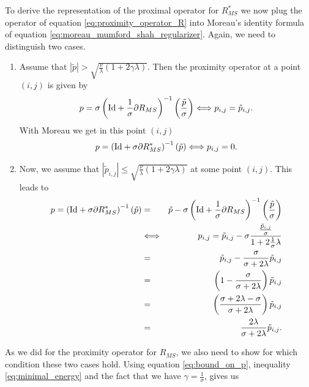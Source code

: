 \documentclass{scrreprt}
\begin{document}
            To derive the representation of the proximal operator for $R_{MS}^{\ast}$ we now plug the operator of equation \ref{eq:proximity_operator_R} into Moreau's identity formula of equation \ref{eq:moreau_mumford_shah_regularizer}. Again, we need to distinguish two cases.
            \begin{enumerate}
                \item Assume that $|\tilde{p}| > \sqrt{\frac{\nu}{\lambda}(1 + 2\gamma\lambda)}$. Then the proximity operator at a point $(i, j)$ is given by
                    $$
                        p = \sigma\left( \textnormal{Id} + \frac{1}{\sigma} \partial R_{MS} \right)^{-1} \left(\frac{\tilde{p}}{\sigma} \right) \Longleftrightarrow p_{i,j} = \tilde{p}_{i,j}.
                    $$
                With Moreau we get in this point $(i, j)$
                    $$
                        p = \left( \textnormal{Id} + \sigma \partial R_{MS}^{\ast} \right)^{-1}(\tilde{p}) \Longleftrightarrow p_{i,j} = 0.
                    $$
                \item Now, we assume that $|\tilde{p}_{i,j}| \le \sqrt{\frac{\nu}{\lambda}(1 + 2\gamma\lambda)}$ at some point $(i,j)$. This leads to
                    \begin{eqnarray}
                        p = \left( \textnormal{Id} + \sigma \partial R_{MS}^{\ast} \right)^{-1}(\tilde{p}) &=& \tilde{p} - \sigma \left( \textnormal{Id} + \frac{1}{\sigma} \partial R_{MS} \right)^{-1} \left(\frac{\tilde{p}}{\sigma} \right) \notag \\
                        &\Longleftrightarrow& p_{i,j} = \tilde{p}_{i,j} - \sigma \frac{\frac{\tilde{p}_{i,j}}{\sigma}}{1 + 2\frac{1}{\sigma}\lambda} \notag \\
                        &=& \tilde{p}_{i,j} - \frac{\sigma}{\sigma + 2\lambda}\tilde{p}_{i,j} \notag \\
                        &=& \left(1 - \frac{\sigma}{\sigma + 2\lambda}\right) \tilde{p}_{i,j} \notag \\
                        &=& \left(\frac{\sigma + 2\lambda - \sigma}{\sigma + 2\lambda}\right) \tilde{p}_{i,j} \notag \\
                        &=& \frac{2\lambda}{\sigma + 2\lambda} \tilde{p}_{i,j}. \notag
                    \end{eqnarray}
            \end{enumerate}
            As we did for the proximity operator for $R_{MS}$, we also need to show for which condition these two cases hold. Using equation \ref{eq:bound_on_p}, inequality \ref{eq:minimal_energy} and the fact that we have $\gamma = \frac{1}{\sigma}$, gives us
\end{document}
